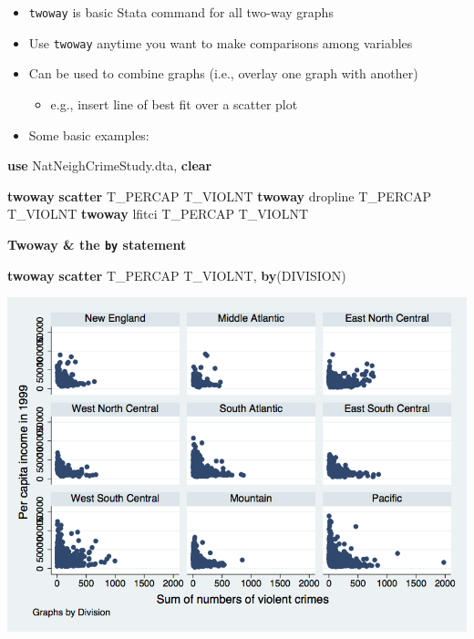 \documentclass[
]{book}
\newenvironment{Shaded}{\begin{snugshade}}{\end{snugshade}}
\newcommand{\BaseNTok}[1]{\textcolor[rgb]{0.00,0.00,0.81}{#1}}
\newcommand{\KeywordTok}[1]{\textcolor[rgb]{0.13,0.29,0.53}{\textbf{#1}}}
\newcommand{\NormalTok}[1]{#1}
\providecommand{\tightlist}{%
  \setlength{\itemsep}{0pt}\setlength{\parskip}{0pt}}
\begin{document}
\begin{itemize}
\tightlist
\item
  \texttt{twoway} is basic Stata command for all two-way graphs
\item
  Use \texttt{twoway} anytime you want to make comparisons among variables
\item
  Can be used to combine graphs (i.e., overlay one graph with another)

  \begin{itemize}
  \tightlist
  \item
    e.g., insert line of best fit over a scatter plot
  \end{itemize}
\item
  Some basic examples:
\end{itemize}

\begin{Shaded}
\begin{Highlighting}[]
\KeywordTok{use}\NormalTok{ NatNeighCrimeStudy.dta, }\KeywordTok{clear}

\KeywordTok{twoway} \KeywordTok{scatter}\NormalTok{ T\_PERCAP T\_VIOLNT}
\KeywordTok{twoway} \BaseNTok{dropline}\NormalTok{ T\_PERCAP T\_VIOLNT}
\KeywordTok{twoway}\NormalTok{ lfitci T\_PERCAP T\_VIOLNT}
\end{Highlighting}
\end{Shaded}

\textbf{Twoway \& the \texttt{by} statement}

\begin{Shaded}
\begin{Highlighting}[]
\KeywordTok{twoway} \KeywordTok{scatter}\NormalTok{ T\_PERCAP T\_VIOLNT, }\KeywordTok{by}\NormalTok{(DIVISION)}
\end{Highlighting}
\end{Shaded}

\includegraphics{Stata/StataGraph/images/twowayby.png}
\end{document}

